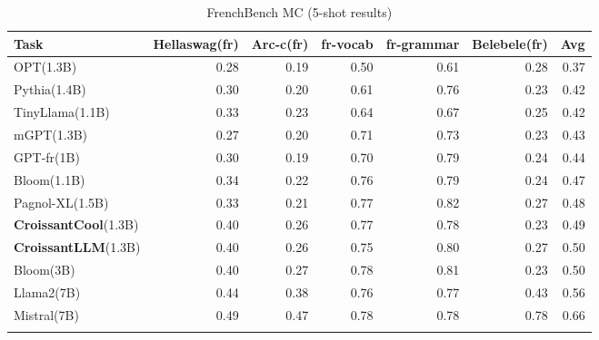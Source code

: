 


\begin{table}
    \centering
        \begin{tabular}{lrrrrrr}
        \toprule
        Task & Hellaswag(fr) & Arc-c(fr) & fr-vocab & fr-grammar & Belebele(fr) & Avg \\
        \midrule
        OPT(1.3B) & 0.28 & 0.19 & 0.50 & 0.61 & 0.28 & 0.37 \\
        Pythia(1.4B) & 0.30 & 0.20 & 0.61 & 0.76 & 0.23 & 0.42 \\
        TinyLlama(1.1B) & 0.33 & 0.23 & 0.64 & 0.67 & 0.25 & 0.42 \\
        mGPT(1.3B) & 0.27 & 0.20 & 0.71 & 0.73 & 0.23 & 0.43 \\
        GPT-fr(1B) & 0.30 & 0.19 & 0.70 & 0.79 & 0.24 & 0.44 \\
        Bloom(1.1B) & 0.34 & 0.22 & 0.76 & 0.79 & 0.24 & 0.47 \\
        Pagnol-XL(1.5B) & 0.33 & 0.21 & 0.77 & 0.82 & 0.27 & 0.48 \\
        \textbf{CroissantCool}(1.3B)& 0.40 & 0.26 & 0.77 & 0.78 & 0.23 & 0.49 \\
        \textbf{CroissantLLM}(1.3B) & 0.40 & 0.26 & 0.75 & 0.80 & 0.27 & 0.50 \\
        Bloom(3B) & 0.40 & 0.27 & 0.78 & 0.81 & 0.23 & 0.50 \\
        \midrule
        Llama2(7B) & 0.44 & 0.38 & 0.76 & 0.77 & 0.43 & 0.56 \\
        Mistral(7B) & 0.49 & 0.47 & 0.78 & 0.78 & 0.78 & 0.66 \\
        \bottomrule
        \vspace{0.2mm}
        \end{tabular}
    \caption[FrenchBench MC results]{FrenchBench MC (5-shot results)}
    \label{tab:fr_res}
\end{table}


